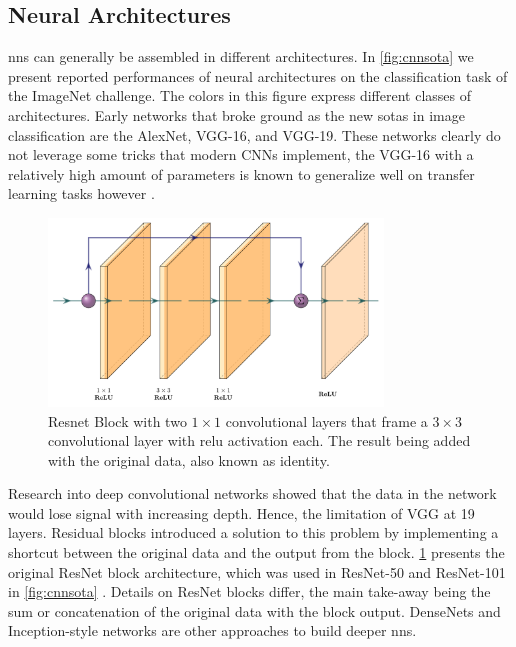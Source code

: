 \subsection{Neural Architectures}
\aclp{nn} can generally be assembled in different architectures. In \cref{fig:cnnsota} we present reported performances of neural architectures on the classification task of the ImageNet challenge. The colors in this figure express different classes of architectures. Early networks that broke ground as the new \aclp{sota} in image classification are the AlexNet, VGG-16, and VGG-19. These networks clearly do not leverage some tricks that modern CNNs implement, the VGG-16 with a relatively high amount of parameters is known to generalize well on transfer learning tasks however \citep{dramsch2018deep}. 

\begin{figure}
    \centering
    \includegraphics[width=\textwidth,height=5cm,keepaspectratio]{figures/resnet.pdf}
    \caption{Resnet Block with two $1\times1$ convolutional layers that frame a $3\times3$ convolutional layer with \ac{relu} activation each. The result being added with the original data, also known as identity.}
    \label{fig:resnet}
\end{figure}

Research into deep convolutional networks showed that the data in the network would lose signal with increasing depth. Hence, the limitation of VGG at 19 layers. Residual blocks introduced a solution to this problem by implementing a shortcut between the original data and the output from the block. \cref{fig:resnet} presents the original ResNet block architecture, which was used in ResNet-50 and ResNet-101 in \cref{fig:cnnsota} \citep{he2016deep}. Details on ResNet blocks differ, the main take-away being the sum or concatenation of the original data with the block output. DenseNets \citep{huang2017densely} and Inception-style networks \citep{szegedy2015going} are other approaches to build deeper \acp{nn}.

